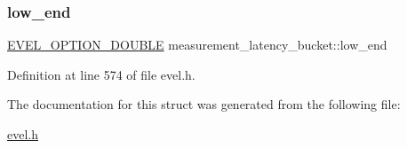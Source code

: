 \subsubsection{\texorpdfstring{low\+\_\+end}{low\_end}}
{\footnotesize\ttfamily \hyperlink{evel_8h_aafc42b3cd9aca88804c3d413e4ccec06}{E\+V\+E\+L\+\_\+\+O\+P\+T\+I\+O\+N\+\_\+\+D\+O\+U\+B\+LE} measurement\+\_\+latency\+\_\+bucket\+::low\+\_\+end}



Definition at line 574 of file evel.\+h.



The documentation for this struct was generated from the following file\+:\begin{DoxyCompactItemize}
\item 
\hyperlink{evel_8h}{evel.\+h}\end{DoxyCompactItemize}
